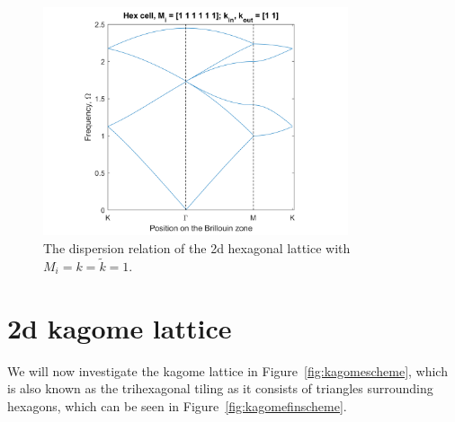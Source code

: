 \begin{figure}[!h]
\centering
\includegraphics[width=0.8\textwidth]{imgs/hexdisper.png}
\caption{\label{fig:hexdisper} The dispersion relation of the 2d hexagonal
    lattice with $M_i=k=\tilde{k}=1$.}
\end{figure}

\section{2d kagome lattice}
We will now investigate the kagome lattice in Figure~\ref{fig:kagomescheme},
which is also known as the trihexagonal tiling as it consists of triangles
surrounding hexagons, which can be seen in Figure~\ref{fig:kagomefinscheme}.

